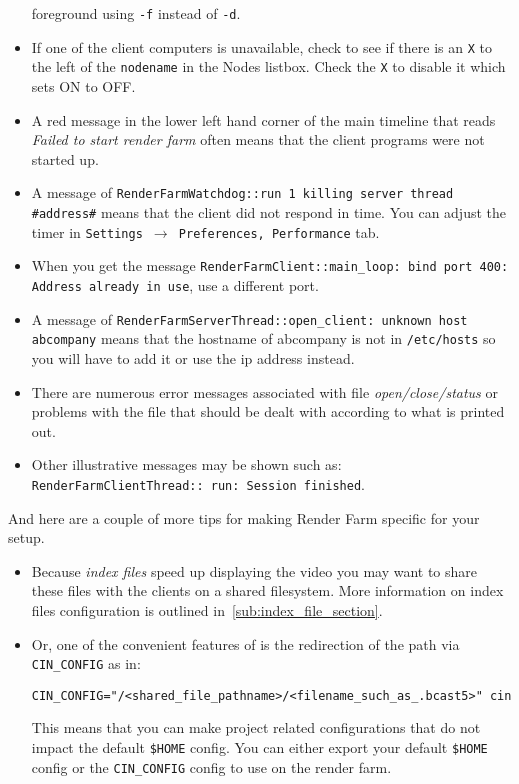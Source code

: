 \begin{itemize}
  foreground using \texttt{-f} instead of \texttt{-d}.
\item If one of the client computers is unavailable, check to see if
  there is an \texttt{X} to the left of the \texttt{nodename} in the
  Nodes listbox.  Check the \texttt{X} to disable it which sets ON to
  OFF.
\item A red message in the lower left hand corner of the main
  timeline that reads \textit{Failed to start render farm} often means
  that the client \CGG{} programs were not started up.
\item A message of \texttt{RenderFarmWatchdog::run 1 killing server
    thread \\ \#address\#} means that the client did not respond in
  time.  You can adjust the timer in \texttt{Settings $\rightarrow$
    Preferences, Performance} tab.
\item When you get the message \texttt{RenderFarmClient::main\_loop:
    bind port 400: Address already in use}, use a different port.
\item A message of \texttt{RenderFarmServerThread::open\_client:
    unknown host abcompany} means that the hostname of abcompany is not
  in \texttt{/etc/hosts} so you will have to add it or use the ip
  address instead.
\item There are numerous error messages associated with file
  \textit{open/close/status} or problems with the file that should be
  dealt with according to what is printed out.
\item Other illustrative messages may be shown such as:
  \texttt{RenderFarmClientThread:: run: Session finished}.
\end{itemize}

And here are a couple of more tips for making Render Farm specific
for your setup.
\begin{itemize}
\item Because \textit{index files} speed up displaying the video you
  may want to share these files with the clients on a shared
  filesystem. More information on index files configuration is
  outlined in~\ref{sub:index_file_section}.
\item Or, one of the convenient features of \CGG{} is the
  redirection of the path via \texttt{CIN\_CONFIG} as in:
\begin{lstlisting}[style=sh]
CIN_CONFIG="/<shared_file_pathname>/<filename_such_as_.bcast5>" cin
\end{lstlisting} This means that you can make project related
  configurations that do not impact the default \texttt{\$HOME}
  config.  You can either export your default \texttt{\$HOME} config
  or the \texttt{CIN\_CONFIG} config to use on the render farm.
\end{itemize}

